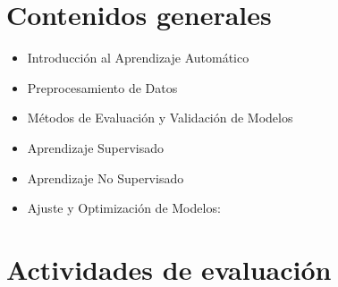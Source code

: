 \documentclass[a4,11pt]{aleph-notas}
\begin{document}
\section{Contenidos generales} 

\begin{itemize}
\item 
    Introducción al Aprendizaje Automático
\item 
    Preprocesamiento de Datos
\item 
    Métodos de Evaluación y Validación de Modelos
\item 
    Aprendizaje Supervisado
\item 
    Aprendizaje No Supervisado
\item 
    Ajuste y Optimización de Modelos:
\end{itemize}

\section{Actividades de evaluación} 
\end{document}
